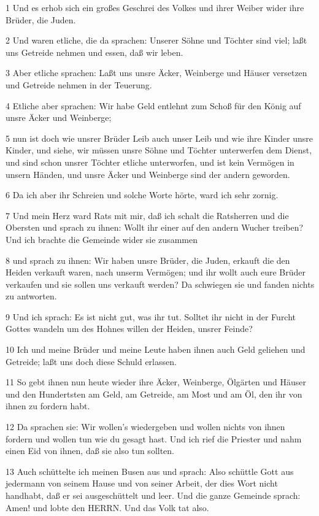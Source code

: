\par 1 Und es erhob sich ein großes Geschrei des Volkes und ihrer Weiber wider ihre Brüder, die Juden.
\par 2 Und waren etliche, die da sprachen: Unserer Söhne und Töchter sind viel; laßt uns Getreide nehmen und essen, daß wir leben.
\par 3 Aber etliche sprachen: Laßt uns unsre Äcker, Weinberge und Häuser versetzen und Getreide nehmen in der Teuerung.
\par 4 Etliche aber sprachen: Wir habe Geld entlehnt zum Schoß für den König auf unsre Äcker und Weinberge;
\par 5 nun ist doch wie unsrer Brüder Leib auch unser Leib und wie ihre Kinder unsre Kinder, und siehe, wir müssen unsre Söhne und Töchter unterwerfen dem Dienst, und sind schon unsrer Töchter etliche unterworfen, und ist kein Vermögen in unsern Händen, und unsre Äcker und Weinberge sind der andern geworden.
\par 6 Da ich aber ihr Schreien und solche Worte hörte, ward ich sehr zornig.
\par 7 Und mein Herz ward Rats mit mir, daß ich schalt die Ratsherren und die Obersten und sprach zu ihnen: Wollt ihr einer auf den andern Wucher treiben? Und ich brachte die Gemeinde wider sie zusammen
\par 8 und sprach zu ihnen: Wir haben unsre Brüder, die Juden, erkauft die den Heiden verkauft waren, nach unserm Vermögen; und ihr wollt auch eure Brüder verkaufen und sie sollen uns verkauft werden? Da schwiegen sie und fanden nichts zu antworten.
\par 9 Und ich sprach: Es ist nicht gut, was ihr tut. Solltet ihr nicht in der Furcht Gottes wandeln um des Hohnes willen der Heiden, unsrer Feinde?
\par 10 Ich und meine Brüder und meine Leute haben ihnen auch Geld geliehen und Getreide; laßt uns doch diese Schuld erlassen.
\par 11 So gebt ihnen nun heute wieder ihre Äcker, Weinberge, Ölgärten und Häuser und den Hundertsten am Geld, am Getreide, am Most und am Öl, den ihr von ihnen zu fordern habt.
\par 12 Da sprachen sie: Wir wollen's wiedergeben und wollen nichts von ihnen fordern und wollen tun wie du gesagt hast. Und ich rief die Priester und nahm einen Eid von ihnen, daß sie also tun sollten.
\par 13 Auch schüttelte ich meinen Busen aus und sprach: Also schüttle Gott aus jedermann von seinem Hause und von seiner Arbeit, der dies Wort nicht handhabt, daß er sei ausgeschüttelt und leer. Und die ganze Gemeinde sprach: Amen! und lobte den HERRN. Und das Volk tat also.
